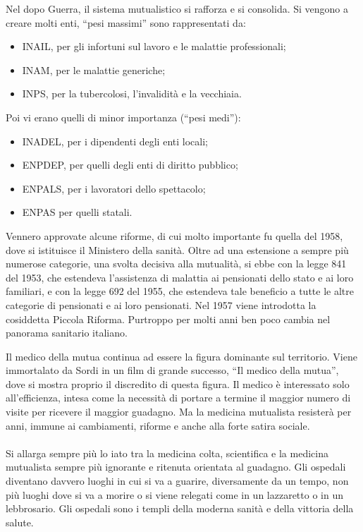 Nel dopo Guerra, il sistema mutualistico si rafforza e si consolida. Si
vengono a creare molti enti, ``pesi massimi'' sono rappresentati da:
\begin{itemize}
\item INAIL, per gli infortuni sul lavoro e le malattie professionali;
\item INAM, per le malattie generiche;
\item INPS, per la tubercolosi, l'invalidità e la vecchiaia.
\end{itemize}

Poi vi erano quelli di minor importanza (``pesi medi''):
\begin{itemize}
\item INADEL, per i dipendenti degli enti locali;
\item ENPDEP, per quelli degli enti di diritto pubblico;
\item ENPALS, per i lavoratori dello spettacolo;
\item ENPAS per quelli statali.
\end{itemize}

Vennero approvate alcune riforme, di cui molto importante fu quella del
1958, dove si istituisce il Ministero della sanità. Oltre ad una
estensione a sempre più numerose categorie, una svolta decisiva alla
mutualità, si ebbe con la legge 841 del 1953, che estendeva l'assistenza
di malattia ai pensionati dello stato e ai loro familiari, e con la
legge 692 del 1955, che estendeva tale beneficio a tutte le altre
categorie di pensionati e ai loro pensionati. Nel 1957 viene introdotta
la cosiddetta Piccola Riforma. Purtroppo per molti anni ben poco cambia
nel panorama sanitario italiano.

Il medico della mutua continua ad essere la figura dominante sul
territorio. Viene immortalato da Sordi in un film di grande successo,
``Il medico della mutua'', dove si mostra proprio il discredito di
questa figura. Il medico è interessato solo all'efficienza, intesa come
la necessità di portare a termine il maggior numero di visite per
ricevere il maggior guadagno. Ma la medicina mutualista resisterà per
anni, immune ai cambiamenti, riforme e anche alla forte satira sociale.
\\\\
Si allarga sempre più lo iato tra la medicina colta, scientifica e la
medicina mutualista sempre più ignorante e ritenuta orientata al
guadagno. Gli ospedali diventano davvero luoghi in cui si va a guarire,
diversamente da un tempo, non più luoghi dove si va a morire o si viene
relegati come in un lazzaretto o in un lebbrosario. Gli ospedali sono i
templi della moderna sanità e della vittoria della salute.

